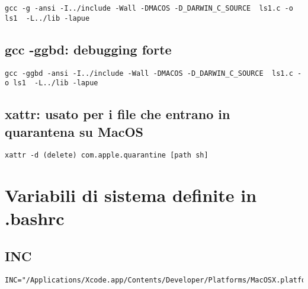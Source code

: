 \begin{lstlisting}
gcc -g -ansi -I../include -Wall -DMACOS -D_DARWIN_C_SOURCE  ls1.c -o ls1  -L../lib -lapue
\end{lstlisting}


\subsection{gcc -ggbd: debugging forte}

\begin{lstlisting}
gcc -ggbd -ansi -I../include -Wall -DMACOS -D_DARWIN_C_SOURCE  ls1.c -o ls1  -L../lib -lapue
\end{lstlisting}


\subsection{xattr: usato per i file che entrano in quarantena su MacOS}

\begin{lstlisting}
xattr -d (delete) com.apple.quarantine [path sh]
\end{lstlisting}





\section{Variabili di sistema definite in .bashrc}

\subsection{INC}

\begin{lstlisting}
INC="/Applications/Xcode.app/Contents/Developer/Platforms/MacOSX.platform/Developer/SDKs/MacOSX.sdk/usr/include/"
\end{lstlisting}

